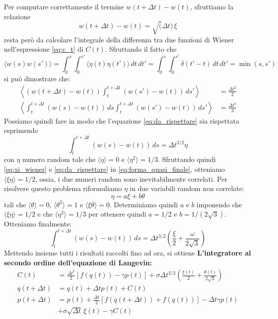 \documentclass[10pt,a4paper]{article}
\begin{document}
Per computare correttamente il termine $w(t+\Delta t) - w(t)$, sfruttiamo la relazione
\begin{equation}
	w(t+\Delta t) - w(t) = \sqrt(\Delta t)\,\xi \label{eq:xi_wiener}
\end{equation}
resta però da calcolare l'integrale della differenza tra due funzioni di Wiener nell'espressione \eqref{eq:c_t} di $C(t)$. Sfruttando il fatto che
\begin{equation}
	\langle w(s)w(s') \rangle = \int_0^s \int_0^{s'} \langle \eta(t)\eta(t') \rangle\,dt\,dt' = \int_0^s \int_0^{s'} \delta(t'-t) \,dt\,dt' = \min(s,s')
\end{equation}
si può dimostrare che:
\begin{align}
	\left\langle (w(t+\Delta t)-w(t))\int_t^{t+\Delta t} (w(s')-w(t))\,ds' \right\rangle &= \frac{\Delta t^2}{2} \label{eq:cosaaaaaa}\\
	\left\langle \int_t^{t+\Delta t} (w(s)-w(t))\,ds \int_t^{t+\Delta t} (w(s')-w(t))\,ds' \right\rangle &= \frac{\Delta t^3}{3} \label{eq:da_rispettare}
\end{align}
Possiamo quindi fare in modo che l'equazione \eqref{eq:da_rispettare} sia rispettata esprimendo
\begin{equation}
	\int_t^{t+\Delta t} (w(s) - w(t))\,ds = \Delta t^{3/2}\eta
	\label{eq:forma_quasi_finale}
\end{equation}
con $\eta$ numero random tale che $\langle\eta\rangle = 0$ e $\langle\eta^2\rangle = 1/3$. Sfruttando quindi \eqref{eq:xi_wiener} e \eqref{eq:da_rispettare} in \eqref{eq:forma_quasi_finale}, otteniamo $\langle \xi \eta \rangle = 1/2$, ossia, i due numeri random sono inevitabilmente correlati. Per risolvere questo problema riformuliamo $\eta$ in due variabili random non correlate:
\begin{equation}
	\eta = a \xi + b \theta
\end{equation}
tali che $\langle\theta\rangle = 0$, $\langle\theta^2\rangle = 1$ e $\langle\xi\theta\rangle = 0$. Determiniamo quindi $a$ e $b$ imponendo che $\langle \xi \eta\rangle = 1/2$ e che $\langle\eta^2\rangle = 1/3$ per ottenere quindi $a = 1/2$ e $b = 1/(2\sqrt{3})$. Otteniamo finalmente:
\begin{equation}
	\int_t^{t+\Delta t} (w(s) - w(t))\,ds = \Delta t^{3/2} \left( \frac{\xi}{2} + \frac{\omega}{2\sqrt{3}} \right)
\end{equation}
Mettendo insieme tutti i risultati raccolti fino ad ora, si ottiene \textbf{L'integratore al secondo ordine dell'equazione di Langevin:}
\begin{align}
 	C(t) &= \frac{\Delta t^2}{2} [f(q(t)) - \gamma p(t)] + \sigma \Delta t^{3/2} \left(\frac{\xi(t)}{2} + \frac{\theta(t)}{2\sqrt{3}} \right) \\
 	q(t+\Delta t) &= q(t) + \Delta t p(t) + C(t) \\
 	p(t+\Delta t) &= p(t) + \frac{\Delta t}{2}[f(q(t+\Delta t)) + f(q(t))] - \Delta t \gamma p(t) \\ &+ \sigma \sqrt{\Delta t}\,\xi(t) - \gamma C(t)
\end{align}
\end{document}
